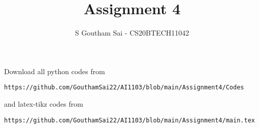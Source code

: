 \documentclass[journal,12pt,twocolumn]{IEEEtran}
\DeclareMathOperator*{\Res}{Res}
\begin{document}
\newcommand{\BEQA}{\begin{eqnarray}}
\newcommand{\EEQA}{\end{eqnarray}}
\newcommand{\define}{\stackrel{\triangle}{=}}

\raggedbottom
\setlength{\parindent}{0pt}
\providecommand{\mbf}{\mathbf}
\providecommand{\pr}[1]{\ensuremath{\Pr\left(#1\right)}}
\providecommand{\qfunc}[1]{\ensuremath{Q\left(#1\right)}}
\providecommand{\sbrak}[1]{\ensuremath{{}\left[#1\right]}}
\providecommand{\lsbrak}[1]{\ensuremath{{}\left[#1\right.}}
\providecommand{\rsbrak}[1]{\ensuremath{{}\left.#1\right]}}
\providecommand{\brak}[1]{\ensuremath{\left(#1\right)}}
\providecommand{\lbrak}[1]{\ensuremath{\left(#1\right.}}
\providecommand{\rbrak}[1]{\ensuremath{\left.#1\right)}}
\providecommand{\cbrak}[1]{\ensuremath{\left\{#1\right\}}}
\providecommand{\lcbrak}[1]{\ensuremath{\left\{#1\right.}}
\providecommand{\rcbrak}[1]{\ensuremath{\left.#1\right\}}}
\theoremstyle{remark}
\newtheorem{rem}{Remark}
\newcommand{\sgn}{\mathop{\mathrm{sgn}}}
\providecommand{\abs}[1]{\vert#1\vert}
\providecommand{\res}[1]{\Res\displaylimits_{#1}} 
\providecommand{\norm}[1]{\lVert#1\rVert}
\providecommand{\mtx}[1]{\mathbf{#1}}
\providecommand{\mean}[1]{E[ #1 ]}
\providecommand{\fourier}{\overset{\mathcal{F}}{ \rightleftharpoons}}
\providecommand{\system}{\overset{\mathcal{H}}{ \longleftrightarrow}}
\newcommand{\solution}{\noindent \textbf{Solution: }}
\newcommand{\cosec}{\,\text{cosec}\,}
\providecommand{\dec}[2]{\ensuremath{\overset{#1}{\underset{#2}{\gtrless}}}}
\newcommand{\myvec}[1]{\ensuremath{\begin{pmatrix}#1\end{pmatrix}}}
\newcommand{\mydet}[1]{\ensuremath{\begin{vmatrix}#1\end{vmatrix}}}
\makeatletter
{}
\makeatother
\let\StandardTheFigure\thefigure
\let\vec\mathbf
\renewcommand{\thefigure}{\theproblem}
\def\putbox#1#2#3{\makebox[0in][l]{\makebox[#1][l]{}\raisebox{\baselineskip}[0in][0in]{\raisebox{#2}[0in][0in]{#3}}}}
     \def\rightbox#1{\makebox[0in][r]{#1}}
     \def\centbox#1{\makebox[0in]{#1}}
     \def\topbox#1{\raisebox{-\baselineskip}[0in][0in]{#1}}
     \def\midbox#1{\raisebox{-0.5\baselineskip}[0in][0in]{#1}}
\vspace{3cm}
\title{Assignment 4}
\author{S Goutham Sai - CS20BTECH11042}
\maketitle
\newpage
\bigskip
\renewcommand{\thefigure}{\theenumi}
\renewcommand{\thetable}{\theenumi}
Download all python codes from 
\begin{lstlisting}
https://github.com/GouthamSai22/AI1103/blob/main/Assignment4/Codes
\end{lstlisting}
%
and latex-tikz codes from 
%
\begin{lstlisting}
https://github.com/GouthamSai22/AI1103/blob/main/Assignment4/main.tex
\end{lstlisting}
\end{document}
